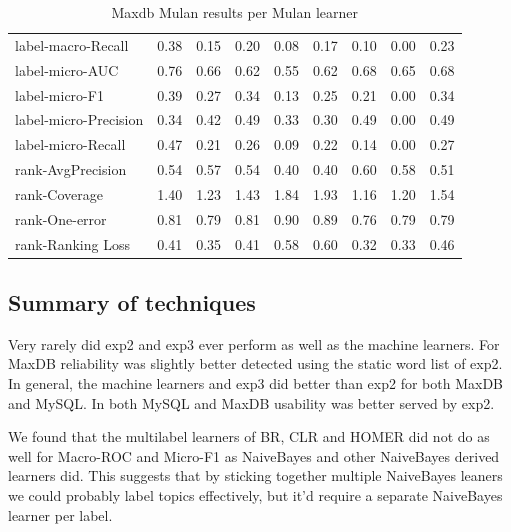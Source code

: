 \documentclass{acm_proc_article-sp}
\begin{document}
\begin{table}
\begin{tabular}{l|rrrrrrrr}
label-macro-Recall & 0.38 & 0.15 & 0.20 & 0.08 & 0.17 & 0.10 & 0.00 & 0.23 \\

label-micro-AUC & 0.76 & 0.66 & 0.62 & 0.55 & 0.62 & 0.68 & 0.65 & 0.68 \\

label-micro-F1 & 0.39 & 0.27 & 0.34 & 0.13 & 0.25 & 0.21 & 0.00 & 0.34 \\

label-micro-Precision & 0.34 & 0.42 & 0.49 & 0.33 & 0.30 & 0.49 & 0.00 & 0.49 \\

label-micro-Recall & 0.47 & 0.21 & 0.26 & 0.09 & 0.22 & 0.14 & 0.00 & 0.27 \\

rank-AvgPrecision & 0.54 & 0.57 & 0.54 & 0.40 & 0.40 & 0.60 & 0.58 & 0.51 \\

rank-Coverage & 1.40 & 1.23 & 1.43 & 1.84 & 1.93 & 1.16 & 1.20 & 1.54 \\

rank-One-error & 0.81 & 0.79 & 0.81 & 0.90 & 0.89 & 0.76 & 0.79 & 0.79 \\

rank-Ranking Loss & 0.41 & 0.35 & 0.41 & 0.58 & 0.60 & 0.32 & 0.33 & 0.46 \\

\end{tabular}

\caption{Maxdb Mulan results per Mulan learner}

\end{table}


\subsection{Summary of techniques}


Very rarely did exp2 and exp3 ever perform as well as the machine learners. For MaxDB reliability was slightly better detected using the static word list of \textsf{exp2}. In general, the machine learners and \textsf{exp3} did better than \textsf{exp2} for both MaxDB and MySQL. In both MySQL and MaxDB usability was better served by \textsf{exp2}.

We found that the multilabel learners of BR, CLR and HOMER did not do as well for Macro-ROC and Micro-F1 as NaiveBayes and other NaiveBayes derived learners did. This suggests that by sticking together multiple NaiveBayes leaners we could probably label topics effectively, but it'd require a separate NaiveBayes learner per label.
\end{document}
